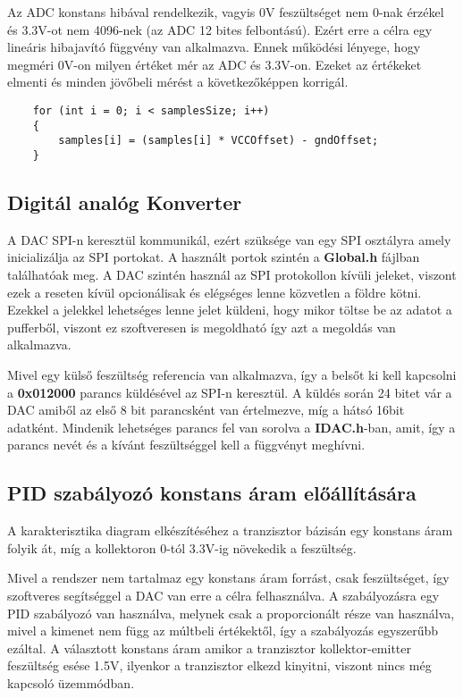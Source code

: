Az ADC konstans hibával rendelkezik, vagyis 0V feszültséget nem 0-nak érzékel
és 3.3V-ot nem 4096-nek (az ADC 12 bites felbontású). Ezért erre a célra egy
lineáris hibajavító függvény van alkalmazva. Ennek működési lényege, hogy
megméri 0V-on milyen értéket mér az ADC és 3.3V-on. Ezeket az értékeket elmenti
és minden jövőbeli mérést a következőképpen korrigál.


\begin{lstlisting}
    for (int i = 0; i < samplesSize; i++)
    {
        samples[i] = (samples[i] * VCCOffset) - gndOffset;
    }
\end{lstlisting}

\subsection{Digitál analóg Konverter}

A DAC SPI-n keresztül kommunikál, ezért
szüksége van egy SPI osztályra amely inicializálja az 
SPI portokat. A használt portok szintén a \textbf{Global.h}
fájlban találhatóak meg. A DAC szintén használ az SPI protokollon
kívüli jeleket, viszont ezek a reseten kívül opcionálisak és 
elégséges lenne közvetlen a földre kötni. Ezekkel a jelekkel
lehetséges lenne jelet küldeni, hogy mikor töltse be az adatot
a pufferből, viszont ez szoftveresen is megoldható így azt a megoldás
van alkalmazva.

Mivel egy külső feszültség referencia van alkalmazva, így a belsőt
ki kell kapcsolni a \textbf{0x012000} parancs küldésével az SPI-n keresztül.
A küldés során 24 bitet vár a DAC amiből az első 8 bit parancsként
van értelmezve, míg a hátsó 16bit adatként. Mindenik lehetséges parancs
fel van sorolva a \textbf{IDAC.h}-ban, amit, így a parancs nevét és a 
kívánt feszültséggel kell a függvényt meghívni.

\subsection{PID szabályozó konstans áram előállítására}

A karakterisztika diagram elkészítéséhez a tranzisztor bázisán egy konstans áram
folyik át, míg a kollektoron 0-tól 3.3V-ig növekedik a feszültség.

Mivel a rendszer nem tartalmaz egy konstans áram forrást, csak feszültséget,
így szoftveres segítséggel a DAC van erre a célra felhasználva. A 
szabályozásra egy PID szabályozó van használva, melynek csak a proporcionált
része van használva, mivel a kimenet nem függ az múltbeli értékektől,
így a szabályozás egyszerűbb ezáltal. A választott konstans áram 
amikor a tranzisztor kollektor-emitter feszültség esése 1.5V, ilyenkor
a tranzisztor elkezd kinyitni, viszont nincs még kapcsoló
üzemmódban.


